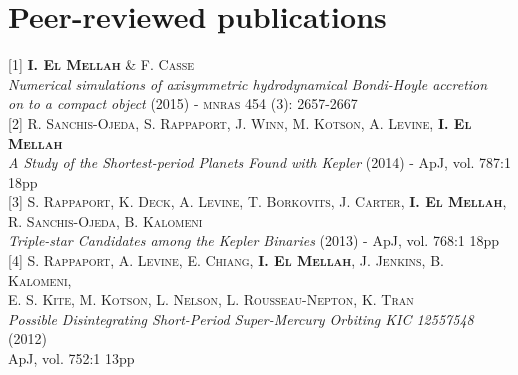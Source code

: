 \documentclass[a4paper,oneside]{article}
\begin{document}
\section*{Peer-reviewed publications}

\begin{flushleft}

[1] \textbf{\textsc{I. El Mellah}} \& F. \textsc{Casse} \\ 
\emph{Numerical simulations of axisymmetric hydrodynamical Bondi-Hoyle accretion}\\
\emph{on to a compact object} (2015) - \textsc{mnras} 454 (3): 2657-2667\\
\vspace*{0.3cm}
[2] R. \textsc{Sanchis-Ojeda}, S. \textsc{Rappaport}, J. \textsc{Winn}, M. \textsc{Kotson}, A. \textsc{Levine}, \textbf{\textsc{I. El Mellah}}\\
\emph{A Study of the Shortest-period Planets Found with Kepler} (2014) - ApJ, vol. 787:1 18pp\\ 
\vspace*{0.3cm}
[3] S. \textsc{Rappaport}, K. \textsc{Deck}, A. \textsc{Levine}, T. \textsc{Borkovits}, J. \textsc{Carter}, \textbf{\textsc{I. El Mellah}}, \\
R. \textsc{Sanchis-Ojeda}, B. \textsc{Kalomeni}\\ 
\emph{Triple-star Candidates among the Kepler Binaries} (2013) - ApJ, vol. 768:1 18pp\\
\vspace*{0.3cm}
[4] S. \textsc{Rappaport}, A. \textsc{Levine}, E. \textsc{Chiang}, \textbf{\textsc{I. El Mellah}}, J. \textsc{Jenkins}, B. \textsc{Kalomeni},\\
E. S. \textsc{Kite}, M. \textsc{Kotson}, L. \textsc{Nelson}, L. \textsc{Rousseau-Nepton}, K. \textsc{Tran} \\ 
\emph{Possible Disintegrating Short-Period Super-Mercury Orbiting KIC 12557548} (2012)\\
ApJ, vol. 752:1 13pp \\

\end{flushleft}
\end{document}

